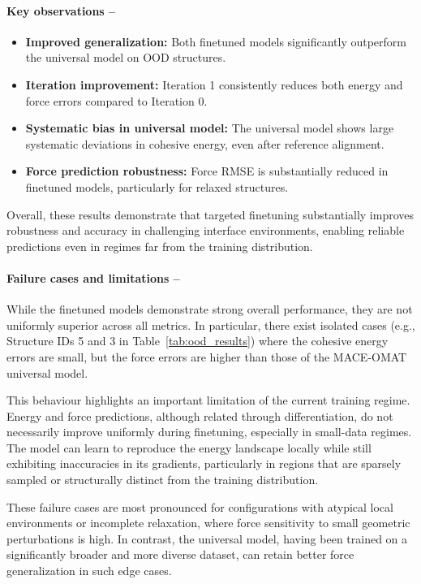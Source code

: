 \documentclass[12pt,a4paper,oneside]{book}
\begin{document}
\paragraph{Key observations --}
\begin{itemize}
    \item \textbf{Improved generalization:} Both finetuned models significantly outperform the universal model on OOD structures.

    \item \textbf{Iteration improvement:} Iteration 1 consistently reduces both energy and force errors compared to Iteration 0.

    \item \textbf{Systematic bias in universal model:} The universal model shows large systematic deviations in cohesive energy, even after reference alignment.

    \item \textbf{Force prediction robustness:} Force RMSE is substantially reduced in finetuned models, particularly for relaxed structures.
\end{itemize}

Overall, these results demonstrate that targeted finetuning substantially improves robustness and accuracy in challenging interface environments, enabling reliable predictions even in regimes far from the training distribution.

\paragraph{Failure cases and limitations --}
While the finetuned models demonstrate strong overall performance, they are not uniformly superior across all metrics. In particular, there exist isolated cases (e.g., Structure IDs 5 and 3 in Table~\ref{tab:ood_results}) where the cohesive energy errors are small, but the force errors are higher than those of the MACE-OMAT universal model.

This behaviour highlights an important limitation of the current training regime. Energy and force predictions, although related through differentiation, do not necessarily improve uniformly during finetuning, especially in small-data regimes. The model can learn to reproduce the energy landscape locally while still exhibiting inaccuracies in its gradients, particularly in regions that are sparsely sampled or structurally distinct from the training distribution.

These failure cases are most pronounced for configurations with atypical local environments or incomplete relaxation, where force sensitivity to small geometric perturbations is high. In contrast, the universal model, having been trained on a significantly broader and more diverse dataset, can retain better force generalization in such edge cases.
\end{document}
